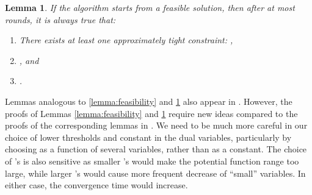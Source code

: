 \documentclass[11pt]{article}
\makeatletter
\newtheorem{lemma}[theorem]{Lemma}
\renewcommand{\paragraph}{\@startsection{paragraph}{4}{\z@}{1ex \@plus 1ex \@minus .2ex}{-.5em}{\normalfont\normalsize\bfseries}}
\newif\iffullpaper
\makeatother
\begin{document}
\begin{lemma}\label{lemma:approx-comp-slack}
If the algorithm starts from a feasible solution, then after at most  rounds, it is always true that:
\begin{enumerate}[noitemsep,topsep=3pt]
\item There exists at least one approximately tight constraint: , 
\item , and
\item .
\end{enumerate}
\end{lemma}
\iffullpaper
\begin{proof}
Suppose that . Then for each  we have:

Due to Lemma \ref{lemma:feasibility}, we have that  is feasible in every round, which implies that  . This further gives:

and, therefore, all variables  increase by a factor . From Lemma \ref{lemma:feasibility}, since the solution always remains feasible, none of the variables can increase to a value larger than 1. Therefore, after at most  rounds, there must exist at least one  such that . If in any round  decreases, it can decrease by at most . Therefore, in every subsequent round 


For the second part of the lemma, let  be the set of constraints that are at least ``-looser" than the tightest constraint. Then for  we have 

This further gives:

 Moreover, for each  we have , since for :
 
Therefore:

Interchanging the order of summation in the last line, we reach the desired inequality.

The proof of the last part of the lemma follows from feasibility: ,  (Lemma \ref{lemma:feasibility}), and from .\end{proof}
\fi
Lemmas analogous to \ref{lemma:feasibility} and \ref{lemma:approx-comp-slack} also appear in \cite{AwerbuchKhandekar2009}. {However, the proofs of Lemmas \ref{lemma:feasibility} and \ref{lemma:approx-comp-slack} require new ideas compared to the proofs of the corresponding lemmas in \cite{AwerbuchKhandekar2009}. We need to be much more careful in our choice of lower thresholds  and constant  in the dual variables, particularly by choosing  as a function of several variables, rather than as a constant. The choice of 's is also sensitive as smaller 's would make the potential function range too large, while larger 's would cause more frequent decrease of ``small'' variables.  In either case, the convergence time would increase. }\paragraph{Decrease of Small Variables.}
\end{document}
